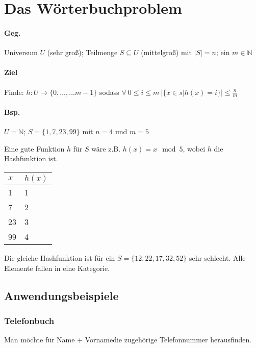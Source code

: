 \section{Das Wörterbuchproblem}

\paragraph*{Geg.} Universum $U$ (sehr groß); Teilmenge $S \subseteq U$ (mittelgroß) mit $|S|=n$; ein $m \in \mathbb{N}$

\paragraph*{Ziel} Finde: $h: U \rightarrow \{ 0,\dots,\dots m-1 \}$ sodass $\forall\ 0 \leq i \leq m\ \big| \{ x \in s | h(x)=i \} \big| \leq \frac{n}{m}$

\paragraph*{Bsp.} $U=\mathbb{N}$; $S=\{ 1,7,23,99 \}$ mit $n=4$ und $m=5$

Eine gute Funktion $h$ für $S$ wäre z.B. $h(x)=x \mod 5$, wobei $h$ die Hashfunktion ist.
\begin{table}[htb!]
\centering
\begin{tabular}{l|l}
$x$ & $h(x)$ \\ 
\hline 
1 & 1 \\ 
7 & 2 \\ 
23 & 3 \\ 
99 & 4 \\ 
\end{tabular} 
\end{table}

Die gleiche Hashfunktion ist für ein $S = \{ 12,22,17,32,52 \}$ sehr schlecht. Alle Elemente fallen in eine Kategorie.


\subsection{Anwendungsbeispiele}

\subsubsection{Telefonbuch}
\par\medskip
Man möchte für Name + Vornamedie zugehörige Telefonnummer herausfinden.\par\medskip

